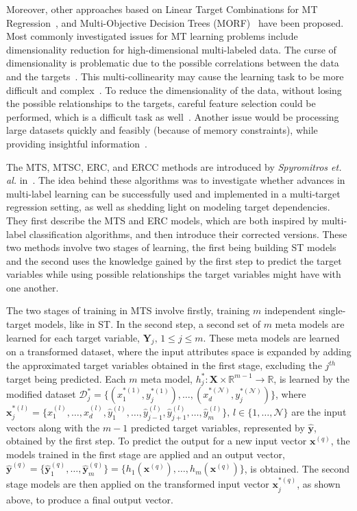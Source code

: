 \documentclass[preprint,12pt]{elsarticle}
\begin{document}
Moreover, other approaches based on Linear Target Combinations for MT Regression~\cite{Tsoumakas2014}, and Multi-Objective Decision Trees (MORF)~\cite{Kocev2007} have been proposed. Most commonly investigated issues for MT learning problems include dimensionality reduction for high-dimensional multi-labeled data. The curse of dimensionality is problematic due to the possible correlations between the data and the targets~\cite{Charte20141842,Ding20152521,He2011}. This multi-collinearity may cause the learning task to be more difficult and complex~\cite{Qian2015594}. To reduce the dimensionality of the data, without losing the possible relationships to the targets, careful feature selection could be performed, which is a difficult task as well~\cite{Lee201580,Li2016827}. Another issue would be processing large datasets quickly and feasibly (because of memory constraints), while providing insightful information~\cite{Borchani2015, 2016-INS-LAIM}.

The MTS, MTSC, ERC, and ERCC methods are introduced by \textit{Spyromitros et. al.} in~\cite{Spyromitros2014}. The idea behind these algorithms was to investigate whether advances in multi-label learning can be successfully used and implemented in a multi-target regression setting, as well as shedding light on modeling target dependencies. They first describe the MTS and ERC models, which are both inspired by multi-label classification algorithms, and then introduce their corrected versions. These two methods involve two stages of learning, the first being building ST models and the second uses the knowledge gained by the first step to predict the target variables while using possible relationships the target variables might have with one another. 

The two stages of training in MTS involve firstly, training $m$ independent single-target models, like in ST. In the second step, a second set of $m$ meta models are learned for each target variable, $\bm{Y}_j,\, 1 \leq j \leq m$. These meta models are learned on a transformed dataset, where the input attributes space is expanded by adding the approximated target variables obtained in the first stage, excluding the $j^{th}$ target being predicted. Each $m$ meta model, $h_j^* : \bm{X} \times \mathbb{R}^{m-1} \rightarrow \mathbb{R}$, is learned by the modified dataset $\mathcal{D}_j^* = \{(x_1^{*(1)},y_j^{*(1)}), \ldots, (x_d^{*(\mathcal{N})},y_j^{*(\mathcal{N})})\}$, where $\bm x_j^{*(l)} = \{x_1^{(l)}, \ldots, x_d^{(l)}, \hat{y}_1^{(l)}, \ldots, \hat{y}_{j-1}^{(l)}, \hat{y}_{j+1}^{(l)}, \ldots, \hat{y}_m^{(l)}\},\, l \in \{1, \ldots, \mathcal{N}\}$ are the input vectors along with the $m-1$ predicted target variables, represented by $\hat{\bm y}$, obtained by the first step. To predict the output for a new input vector $\bm{x}^{(q)}$, the models trained in the first stage are applied and an output vector, $\hat{\bm{y}}^{(q)} = \{\hat{\bm{y}}_1^{(q)}, \ldots, \hat{\bm{y}}_m^{(q)}\} = \{h_1(\bm{x}^{(q)}), \ldots, h_m(\bm{x}^{(q)})\}$, is obtained. The second stage models are then applied on the transformed input vector $\bm x_j^{*(q)}$, as shown above, to produce a final output vector.
\end{document}
